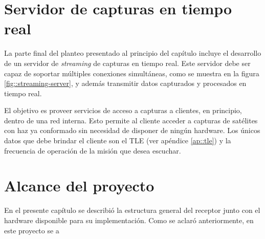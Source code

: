 \documentclass[../../main.tex]{subfiles}
\begin{document}
\section{Servidor de capturas en tiempo real}
La parte final del planteo presentado al principio del capítulo incluye el desarrollo de un servidor de \textit{streaming} de capturas en tiempo real. Este servidor debe ser capaz de soportar múltiples conexiones simultáneas, como se muestra en la figura \ref{fig::streaming-server}, y además transmitir datos capturados y procesados en tiempo real. 

El objetivo es proveer servicios de acceso a capturas a clientes, en principio, dentro de una red interna. Esto permite al cliente acceder a capturas de satélites con haz ya conformado sin necesidad de disponer de ningún hardware. Los únicos datos que debe brindar el cliente son el TLE (ver apéndice \ref{ap::tle}) y la frecuencia de operación de la misión que desea escuchar. 


\section{Alcance del proyecto}
En el presente capítulo se describió la estructura general del receptor junto con el hardware disponible para su implementación. Como se aclaró anteriormente, en este proyecto se a
\end{document}
